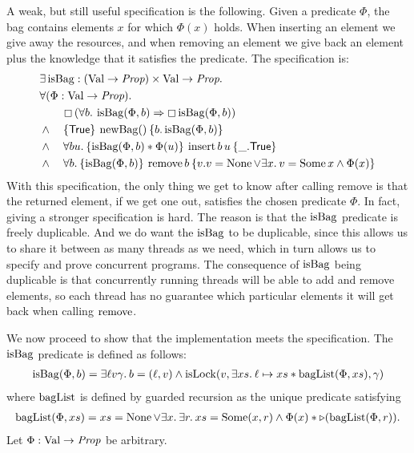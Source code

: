 \begin{example}
  A weak, but still useful specification is the following.  Given a
  predicate $\Phi$, the bag contains elements $x$ for which $\Phi(x)$
  holds.  When inserting an element we give away the resources, and
  when removing an element we give back an element plus the knowledge
  that it satisfies the predicate.  
  The specification is:
  \begin{align*}
    &\Exists \isBag : (\Val \to \Prop) \times \Val \to \Prop.\nonumber\\
    &\All (\Phi : \Val \to \Prop).\nonumber\\
    &\quad\quad\persistently\left(\All b . \isBag(\Phi, b) \implies \persistently \isBag(\Phi,b)\right)\\
    &\land\quad\hoare{\TRUE}{\newBag \TT}{b. \isBag(\Phi,b)}\\
    &\land\quad\All b u.\hoare{\isBag(\Phi,b) \ast \Phi(u)}{\binsert b\,u}{\_.\TRUE}\\
    &\land\quad\All b.\hoare{\isBag(\Phi,b)}{\bremove b}{v.v = \None \lor \Exists x . v = \Some x \land \Phi(x)}
  \end{align*}
  With this specification, the only thing we get to know after calling
  remove is that the returned element, if we get one out, satisfies
  the chosen predicate $\Phi$.  In fact, giving a stronger
  specification is hard.  The reason is that the $\operatorname{isBag}$
  predicate is freely duplicable.  And we do want the $\operatorname{isBag}$ to be
  duplicable, since this allows us to share it between as many threads
  as we need, which in turn allows us to specify and prove concurrent
  programs.  The consequence of $\operatorname{isBag}$ being duplicable is that
  concurrently running threads will be able to add and remove elements, so
  each thread has no guarantee  which particular elements it will
  get back when calling $\operatorname{remove}$.
  
  We now proceed to show that the implementation meets the
  specification. The $\operatorname{isBag}$ predicate is defined as follows:
  \begin{align*}
    \isBag(\Phi, b) = \Exists \ell v \gamma . b = (\ell, v) \land \isLock(v, \Exists xs . \ell \pointsto xs \ast \baglist(\Phi,xs), \gamma)
  \end{align*}
  where $\operatorname{bagList}$ is defined by guarded recursion as the unique predicate satisfying
  \begin{align*}
    \baglist(\Phi,xs) = xs = \None \lor \Exists x . \Exists r . xs = \Some (x, r) \land \Phi(x) \ast \later(\baglist(\Phi,r)).
  \end{align*}
  Let $\Phi : \text{Val} \to \textit{Prop}$ be arbitrary.


\end{example}
